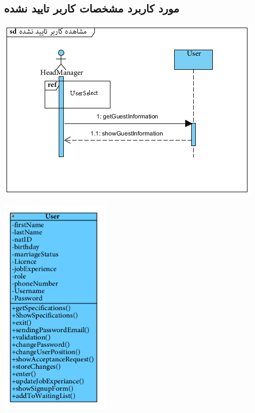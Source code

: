 \subsection*{مورد کاربرد مشخصات کاربر تایید نشده}
\vspace{2cm}
\begin{center}
\includegraphics[width=\textwidth]{SequenceDiagrams/5.png}
\end{center}

\newpage
\vspace{2cm}
\begin{center}
\includegraphics[width=0.4\textwidth]{SequenceClasses/5.png}
\end{center}

